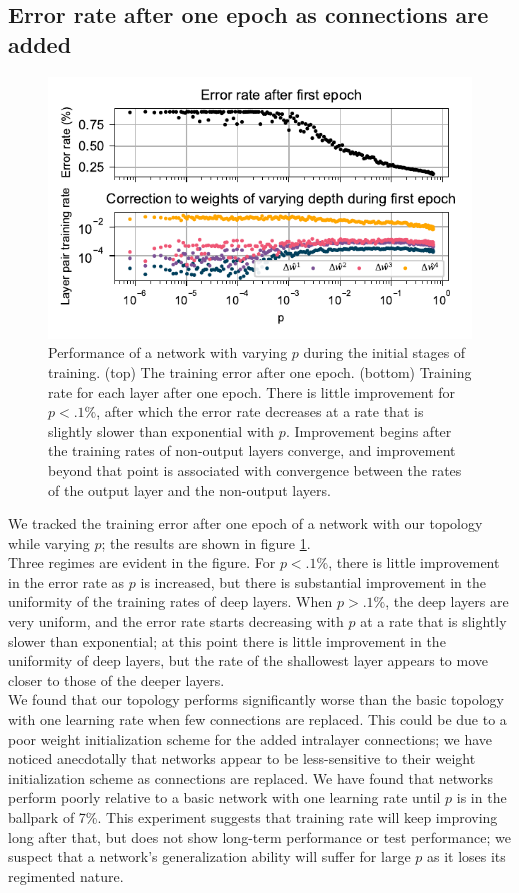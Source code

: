 \documentclass[format=sigconf]{acmart}
\newcommand{\npar}{\\\indent}
\begin{document}
\subsection{Error rate after one epoch as connections are added}
\label{sec:mnist_1epoch}

\begin{figure}
  \centering
  \includegraphics[width=\columnwidth]{figures/MNIST_one_epoch_performance.pdf}
  \caption{Performance of a network with  varying $p$ during the initial stages of training. (top) The training error after one epoch. (bottom) Training rate for each layer after one epoch. There is little improvement for $p<.1\%$, after which the error rate decreases at a rate that is slightly slower than exponential with $p$. Improvement begins after the training rates of non-output layers converge, and improvement beyond that point is associated with convergence between the rates of the output layer and the non-output layers.}
  \label{fig:mnist_1epoch}
\end{figure}

We tracked the training error after one epoch of a network with our topology while varying $p$; the results are shown in figure \ref{fig:mnist_1epoch}.
\npar
Three regimes are evident in the figure. For $p<.1\%$, there is little improvement in the error rate as $p$ is increased, but there is substantial improvement in the uniformity of the training rates of deep layers. When $p>.1\%$, the deep layers are very uniform, and the error rate starts decreasing with $p$ at a rate that is slightly slower than exponential; at this point there is little improvement in the uniformity of deep layers, but the rate of the shallowest layer appears to move closer to those of the deeper layers.
\npar
We found that our topology performs significantly worse than the basic topology with one learning rate when few connections are replaced. This could be due to a poor weight initialization scheme for the added intralayer connections; we have noticed anecdotally that networks appear to be less-sensitive to their weight initialization scheme as connections are replaced. We have found that networks perform poorly relative to a basic network with one learning rate until $p$ is in the ballpark of 7\%. This experiment suggests that training rate will keep improving long after that, but does not show long-term performance or test performance; we suspect that a network's generalization ability will suffer for large $p$ as it loses its regimented nature.
\end{document}
